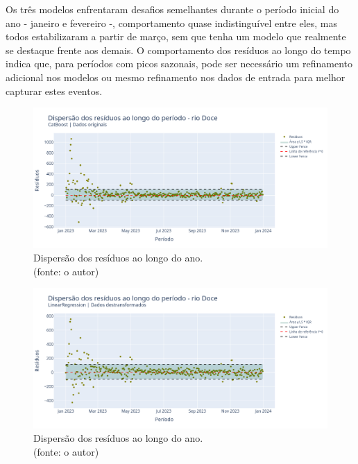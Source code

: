 Os três modelos enfrentaram desafios semelhantes durante o período inicial do ano - janeiro e fevereiro -, comportamento quase indistinguível entre eles, mas todos estabilizaram a partir de março, sem que tenha um modelo que realmente se destaque frente aos demais. O comportamento dos resíduos ao longo do tempo indica que, para períodos com picos sazonais, pode ser necessário um refinamento adicional nos modelos ou mesmo refinamento nos dados de entrada para melhor capturar estes eventos.

\begin{figure}[!h]
	\centering
	\includegraphics[scale=0.33]{Figuras/rio_doce/wfv/CB/CB_WFV_ORIG_RESID_x_TEMPO.png}
	\caption{Dispersão dos resíduos ao longo do ano.\\(fonte: o autor)}
	\label{fig:doce_CB_WFV_ORIG_RESID_x_TEMPO}
\end{figure}

\begin{figure}[!h]
	\centering
	\includegraphics[scale=0.33]{Figuras/rio_doce/wfv/LR/LR_WFV_LOG_RESID_x_TEMPO.png}
	\caption{Dispersão dos resíduos ao longo do ano.\\(fonte: o autor)}
	\label{fig:doce_LR_WFV_LOG_RESID_x_TEMPO}
\end{figure}

